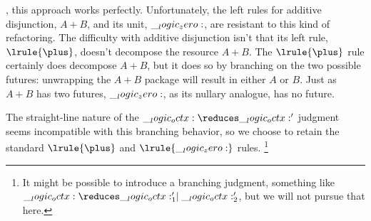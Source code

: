 , this approach works perfectly.
Unfortunately, the left rules for additive disjunction, $A \plus B$, and its unit, $\__logic_zero:$, are resistant to this kind of refactoring.
The difficulty with additive disjunction isn't that its left rule, $\lrule{\plus}$,%
doesn't decompose the resource $A \plus B$.
The $\lrule{\plus}$ rule certainly does decompose $A \plus B$, but it does so by branching on the two possible futures: unwrapping the $A \plus B$ package will result in either $A$ or $B$.
Just as $A \plus B$ has two futures, $\__logic_zero:$, as its nullary analogue, has no future.

The straight-line nature of the $\octx \reduces \octx'$ judgment seems incompatible with this branching behavior, so we choose to retain the standard $\lrule{\plus}$ and $\lrule{\zero}$ rules.%
\footnote[][-1.5\baselineskip]{It might be possible to introduce a branching judgment, something like $\octx \reduces \octx'_1 \mid \octx'_2$, but we will not pursue that here.}

